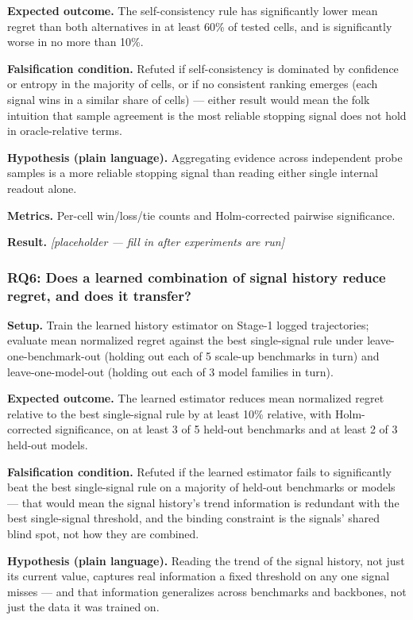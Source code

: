 \documentclass[11pt]{article}
\newcommand{\ph}{\textit{[placeholder --- fill in after experiments are run]}}
\begin{document}
\textbf{Expected outcome.} The self-consistency rule has significantly lower mean regret than both alternatives in at least 60\% of tested cells, and is significantly worse in no more than 10\%.

\textbf{Falsification condition.} Refuted if self-consistency is dominated by confidence or entropy in the majority of cells, or if no consistent ranking emerges (each signal wins in a similar share of cells) --- either result would mean the folk intuition that sample agreement is the most reliable stopping signal does not hold in oracle-relative terms.

\textbf{Hypothesis (plain language).} Aggregating evidence across independent probe samples is a more reliable stopping signal than reading either single internal readout alone.

\textbf{Metrics.} Per-cell win/loss/tie counts and Holm-corrected pairwise significance.

\textbf{Result.} \ph

\subsubsection{RQ6: Does a learned combination of signal history reduce regret, and does it transfer?}
\textbf{Setup.} Train the learned history estimator on Stage-1 logged trajectories; evaluate mean normalized regret against the best single-signal rule under leave-one-benchmark-out (holding out each of 5 scale-up benchmarks in turn) and leave-one-model-out (holding out each of 3 model families in turn).

\textbf{Expected outcome.} The learned estimator reduces mean normalized regret relative to the best single-signal rule by at least 10\% relative, with Holm-corrected significance, on at least 3 of 5 held-out benchmarks and at least 2 of 3 held-out models.

\textbf{Falsification condition.} Refuted if the learned estimator fails to significantly beat the best single-signal rule on a majority of held-out benchmarks or models --- that would mean the signal history's trend information is redundant with the best single-signal threshold, and the binding constraint is the signals' shared blind spot, not how they are combined.

\textbf{Hypothesis (plain language).} Reading the trend of the signal history, not just its current value, captures real information a fixed threshold on any one signal misses --- and that information generalizes across benchmarks and backbones, not just the data it was trained on.
\end{document}
